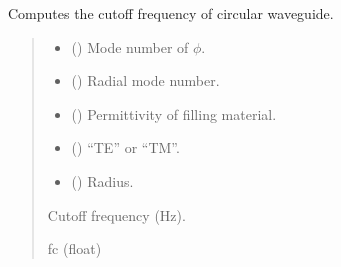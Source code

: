\documentclass[letterpaper,10pt,english]{sphinxmanual}
\begin{document}

\begin{fulllineitems}
\label{\detokenize{components:components.fcutoff_CWG}}
\pysigstartsignatures
{}
\pysigstopsignatures
\sphinxAtStartPar
Computes the cutoff frequency of circular waveguide.
\begin{quote}\begin{description}
\begin{itemize}
\item {}
\sphinxAtStartPar
{} () \textendash{} Mode number of \(\phi\).

\item {}
\sphinxAtStartPar
{} () \textendash{} Radial mode number.

\item {}
\sphinxAtStartPar
{} () \textendash{} Permittivity of filling material.

\item {}
\sphinxAtStartPar
{} () \textendash{} “TE” or “TM”.

\item {}
\sphinxAtStartPar
{} () \textendash{} Radius.

\end{itemize}

\sphinxAtStartPar
Cutoff frequency (Hz).

\sphinxAtStartPar
fc (float)

\end{description}\end{quote}

\end{fulllineitems}
\end{document}
